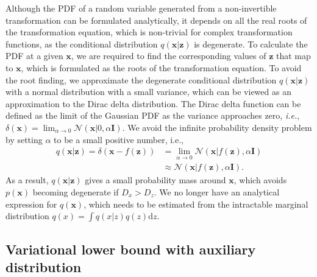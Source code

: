 \documentclass[twoside]{article}
\newcommand{\xV}{\mathbf{x}}
\newcommand{\zV}{\mathbf{z}}
\newcommand{\I}{\mathbf{I}}
\newcommand{\diff}{\text{d}}
\newcommand{\gaussianDist}[3]{\mathcal{N}\left(#1|#2,#3\right)}
\newcommand{\ie}{\textit{i.e.}}
\begin{document}
Although the PDF of a random variable generated from a non-invertible transformation can be formulated analytically, it depends on all the real roots of the transformation equation, which is non-trivial for complex transformation functions, as the conditional distribution $q(\xV|\zV)$ is degenerate. To calculate the PDF at a given $\xV$, we are required to find the corresponding values of $\zV$ that map to $\xV$, which is formulated as the roots of the transformation equation. To avoid the root finding, we approximate the degenerate conditional distribution $q(\xV|\zV)$ with a normal distribution with a small variance, which can be viewed as an approximation to the Dirac delta distribution. The Dirac delta function can be defined as the limit of the Gaussian PDF as the variance approaches zero, \ie, $\delta(\xV) = \lim_{\alpha \rightarrow 0} \gaussianDist{\xV}{0}{\alpha\I}$. We avoid the infinite probability density problem by setting $\alpha$ to be a small positive number, i.e.,
\begin{equation}
\begin{split}
q(\xV|\zV) = \delta(\xV - f(\zV)) &= \lim_{\alpha \rightarrow 0} \gaussianDist{\xV}{f(\zV)}{\alpha\I}\\
 &\approx \gaussianDist{\xV}{f(\zV)}{\alpha\I}.
\end{split}
\end{equation}
As a result, $q(\xV|\zV)$ gives a small probability mass around $\xV$, which avoids $p(\xV)$ becoming degenerate if $D_x > D_z$. We no longer have an analytical expression for $q(\xV)$, which needs to be estimated from the intractable marginal distribution $q(x) = \int q(x|z) q(z) \diff z$.

\subsection{Variational lower bound with auxiliary distribution}
\end{document}

